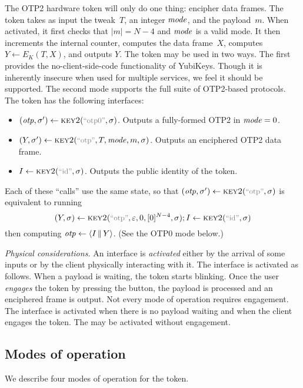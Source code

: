 \newcommand{\fancykey}{\schemefont{key2}}
%
The OTP2 hardware token will only do one thing: encipher data frames.  The token
takes as input the tweak~$T$, an integer $\mathit{mode}$, and the payload~$m$.  When
activated, it first checks that $|m| = N-4$ and $\mathit{mode}$ is a valid mode. It
then increments the internal counter, computes the data frame~$X$, computes $Y
\gets E_K(T,X)$, and outputs $Y$.
%
The token may be used in two ways. The first provides the no-client-side-code
functionality of YubiKeys. Though it is inherently insecure when used for
multiple services, we feel it should be supported. The second mode supports the
full suite of OTP2-based protocols. The token has the following interfaces:
\begin{itemize}
  \item $(\otp, \sigma') \gets \fancykey(\stringer{otp0}, \sigma)$. Outputs a
    fully-formed OTP2 in $\mathit{mode}=0$.
  \item $(Y, \sigma') \gets \fancykey(\stringer{otp}, T, \mode, m, \sigma)$.
    Outputs an enciphered OTP2 data frame.
  \item $I \gets \fancykey(\stringer{id}, \sigma)$. Outputs the public identity
    of the token.
\end{itemize}
%
Each of these ``calls'' use the same state, so that $(\otp, \sigma') \gets
\fancykey(\stringer{otp}, \sigma)$ is equivalent to running
\[
  (Y, \sigma) \gets \fancykey(\stringer{otp}, \emptystr, 0, \byte(0)^{N-4},  \sigma);
  I \gets \fancykey(\stringer{id}, \sigma)
\]
then computing $\otp \gets \str(I \cat Y)$. (See the OTP0 mode below.)

\textit{Physical considerations.}
An interface is \emph{activated} either by the arrival of some inputs or by the
client physically interacting with it.
%
The  interface is activated as follows. When a payload is waiting,
the token starts blinking. Once the user \emph{engages} the token by pressing
the button, the payload is processed and an enciphered frame is output. Not every
mode of operation requires engagement.
%
The  interface is activated when there is no payload waiting and
when the client engages the token.
%
The  may be activated without engagement.
%

\subsection{Modes of operation}
We describe four modes of operation for the token.
%

